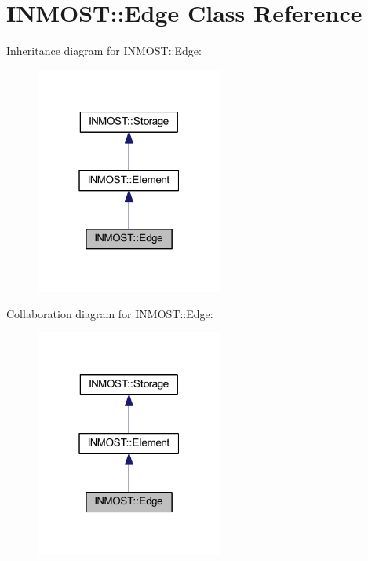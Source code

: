 \hypertarget{classINMOST_1_1Edge}{\section{I\-N\-M\-O\-S\-T\-:\-:Edge Class Reference}
\label{classINMOST_1_1Edge}
}


Inheritance diagram for I\-N\-M\-O\-S\-T\-:\-:Edge\-:\nopagebreak
\begin{figure}[H]
\begin{center}
\leavevmode
\includegraphics[width=175pt]{classINMOST_1_1Edge__inherit__graph}
\end{center}
\end{figure}


Collaboration diagram for I\-N\-M\-O\-S\-T\-:\-:Edge\-:\nopagebreak
\begin{figure}[H]
\begin{center}
\leavevmode
\includegraphics[width=175pt]{classINMOST_1_1Edge__coll__graph}
\end{center}
\end{figure}
